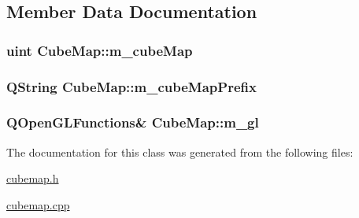 \subsection{Member Data Documentation}
\hypertarget{class_cube_map_a07859b9c39b4c06f4b63e99b00ede4a6}{
\subsubsection[{m\+\_\+cube\+Map}]{\setlength{\rightskip}{0pt plus 5cm}uint Cube\+Map\+::m\+\_\+cube\+Map\hspace{0.3cm}{\ttfamily [protected]}}}\label{class_cube_map_a07859b9c39b4c06f4b63e99b00ede4a6}
\hypertarget{class_cube_map_a74ee2f47f59a87bc920c96396a7b33d5}{
\subsubsection[{m\+\_\+cube\+Map\+Prefix}]{\setlength{\rightskip}{0pt plus 5cm}Q\+String Cube\+Map\+::m\+\_\+cube\+Map\+Prefix\hspace{0.3cm}{\ttfamily [protected]}}}\label{class_cube_map_a74ee2f47f59a87bc920c96396a7b33d5}
\hypertarget{class_cube_map_aab54def10539c674bd20212eea34a1f0}{
\subsubsection[{m\+\_\+gl}]{\setlength{\rightskip}{0pt plus 5cm}Q\+Open\+G\+L\+Functions\& Cube\+Map\+::m\+\_\+gl\hspace{0.3cm}{\ttfamily [protected]}}}\label{class_cube_map_aab54def10539c674bd20212eea34a1f0}


The documentation for this class was generated from the following files\+:\begin{DoxyCompactItemize}
\item 
\hyperlink{cubemap_8h}{cubemap.\+h}\item 
\hyperlink{cubemap_8cpp}{cubemap.\+cpp}\end{DoxyCompactItemize}
